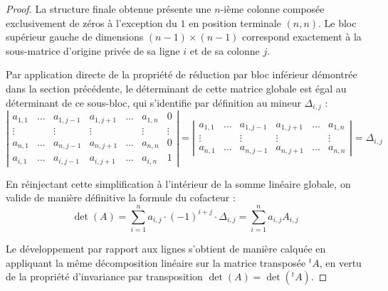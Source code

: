 \documentclass[12pt, a4paper]{report}
\begin{document}
\begin{proof}
    La structure finale obtenue présente une $n$-ième colonne composée exclusivement de zéros à l'exception du $1$ en position terminale $(n,n)$. Le bloc supérieur gauche de dimensions $(n-1) \times (n-1)$ correspond exactement à la sous-matrice d'origine privée de sa ligne $i$ et de sa colonne $j$.

    Par application directe de la propriété de réduction par bloc inférieur démontrée dans la section précédente, le déterminant de cette matrice globale est égal au déterminant de ce sous-bloc, qui s'identifie par définition au mineur $\Delta_{i,j}$ :
    $$\left|\begin{matrix} 
        a_{1,1} & \dots & a_{1,j-1} & a_{1,j+1} & \dots & a_{1,n} & 0 \\
        \vdots & & \vdots & \vdots & & \vdots & \vdots \\
        a_{n,1} & \dots & a_{n,j-1} & a_{n,j+1} & \dots & a_{n,n} & 0 \\
        a_{i,1} & \dots & a_{i,j-1} & a_{i,j+1} & \dots & a_{i,n} & 1
    \end{matrix}\right| = \left|\begin{matrix} 
        a_{1,1} & \dots & a_{1,j-1} & a_{1,j+1} & \dots & a_{1,n} \\
        \vdots & & \vdots & \vdots & & \vdots \\
        a_{n,1} & \dots & a_{n,j-1} & a_{n,j+1} & \dots & a_{n,n}
    \end{matrix}\right| = \Delta_{i,j}$$

    En réinjectant cette simplification à l'intérieur de la somme linéaire globale, on valide de manière définitive la formule du cofacteur :
    $$\det(A) = \sum_{i=1}^n a_{i,j} \cdot (-1)^{i+j} \cdot \Delta_{i,j} = \sum_{i=1}^n a_{i,j} A_{i,j}$$

    Le développement par rapport aux lignes s'obtient de manière calquée en appliquant la même décomposition linéaire sur la matrice transposée $^t A$, en vertu de la propriété d'invariance par transposition $\det(A) = \det(^t A)$.
\end{proof}
\end{document}

